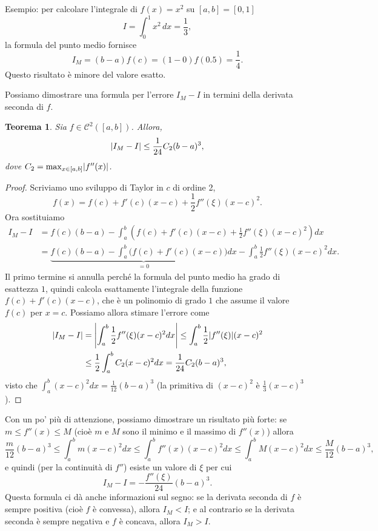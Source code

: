\documentclass[a4paper]{report}
\DeclarePairedDelimiter{\abs}{\lvert}{\rvert}
\newtheorem{theorem}{Teorema}[chapter]
\theoremstyle{definiton}
\theoremstyle{remark}
\begin{document}
Esempio: per calcolare l'integrale di $f(x)=x^2$ su $[a,b]=[0,1]$
\[
    I = \int_0^1 x^2\, dx = \frac{1}{3},
\]
la formula del punto medio fornisce
\[
    I_M = (b-a)f(c) = (1-0)f(0.5) = \frac{1}{4}.
\]
Questo risultato è minore del valore esatto.

Possiamo dimostrare una formula per l'errore $I_M-I$ in termini della derivata seconda di $f$.
\begin{theorem}
Sia $f\in\mathcal{C}^2([a,b])$. Allora,
\[
\abs{I_M-I} \leq \frac{1}{24}C_2 (b-a)^3,
\]
dove $C_2 = \max_{x\in [a,b]} \abs{f''(x)}$.
\end{theorem}
\begin{proof}
Scriviamo uno sviluppo di Taylor in $c$ di ordine 2,
\[
f(x) = f(c) + f'(c)(x-c) + \frac12 f''(\xi)(x-c)^2.
\]
Ora sostituiamo
\begin{align*}
    I_M - I &= f(c)(b-a) - \int_{a}^b \left(f(c) + f'(c)(x-c) + \frac12 f''(\xi)(x-c)^2\right)dx\\
    &= \underbrace{f(c)(b-a) - \int_{a}^b \biggl(f(c) + f'(c)(x-c)\biggr)dx}_{=0} - \int_a^b \frac12 f''(\xi)(x-c)^2dx.
\end{align*}
Il primo termine si annulla perché la formula del punto medio ha grado di esattezza $1$, quindi calcola esattamente l'integrale della funzione $f(c) + f'(c)(x-c)$, che è un polinomio di grado $1$ che assume il valore $f(c)$ per $x=c$. Possiamo allora stimare l'errore come
\begin{align*}
\abs{I_M - I} &= \abs*{\int_a^b \frac12 f''(\xi)(x-c)^2 dx}
    \leq \int_a^b \frac12 \abs{f''(\xi)}(x-c)^2 
    \\ &\leq \frac12  \int_a^b C_2(x-c)^2 dx = \frac1{24}C_2 (b-a)^3,
\end{align*}
visto che $\int_a^b (x-c)^2 dx = \frac{1}{12}(b-a)^3$ (la primitiva di $(x-c)^2$ è $\frac{1}{3}(x-c)^3$).
\end{proof}
Con un po' più di attenzione, possiamo dimostrare un risultato più forte: se $m \leq f''(x) \leq M$ (cioè $m$ e $M$ sono il minimo e il massimo di $f''(x)$) allora
\[
\frac{m}{12}(b-a)^3 \leq \int_a^b m(x-c)^2 dx \leq \int_a^b f''(x)(x-c)^2 dx \leq \int_a^b M(x-c)^2 dx \leq \frac{M}{12}(b-a)^3,
\]
e quindi (per la continuità di $f''$) esiste un valore di $\xi$ per cui
\[
I_M - I = -\frac{f''(\xi)}{24}(b-a)^3.
\]
Questa formula ci dà anche informazioni sul segno: se la derivata seconda di $f$ è sempre positiva (cioè $f$ è convessa), allora $I_M < I$; e al contrario se la derivata seconda è sempre negativa e $f$ è concava, allora $I_M > I$.
\end{document}
